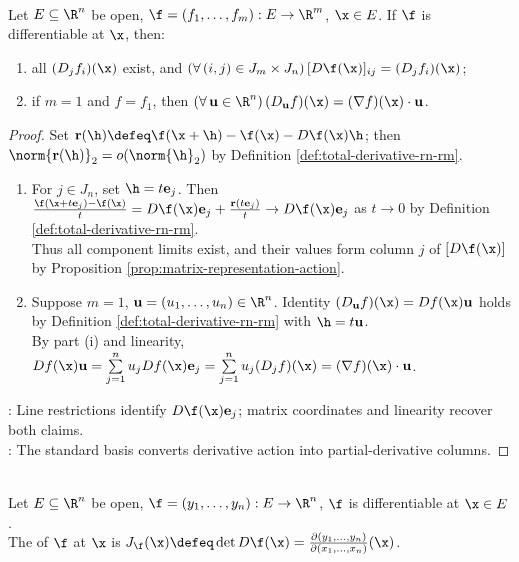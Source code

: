 \begin{theorem} \label{thm:total-derivative-matrix-partials} \\
Let $E\subseteq\R^n$ be open, $\f=(f_1,\ldots,f_m):E\to\R^m$, $\x\in E$. If $\f$ is differentiable at $\x$, then:
\begin{enumerate}[label=(\roman*)]
\setlength{\itemsep}{0pt}
\item all $(D_jf_i)(\x)$ exist, and $(\forall\,(i,j)\in J_m\times J_n)\,[D\f(\x)]_{ij}=(D_jf_i)(\x)$;
\item if $m=1$ and $f=f_1$, then $(\forall\,\mathbf u\in\R^n)\,(D_{\mathbf u}f)(\x)=(\nabla f)(\x)\cdot\mathbf u$.
\end{enumerate}
\begin{proof}
Set $\mathbf r(\h)\defeq\f(\x+\h)-\f(\x)-D\f(\x)\h$; then $\norm{\mathbf r(\h)}_2=o(\norm{\h}_2)$ by Definition \ref{def:total-derivative-rn-rm}.
\begin{enumerate}[label=(\roman*)]
\setlength{\itemsep}{0pt}
\item For $j\in J_n$, set $\h=t\mathbf e_j$. Then $\frac{\f(\x+t\mathbf e_j)-\f(\x)}{t}=D\f(\x)\mathbf e_j+\frac{\mathbf r(t\mathbf e_j)}{t}\to D\f(\x)\mathbf e_j$ as $t\to0$ by Definition \ref{def:total-derivative-rn-rm}.\\
Thus all component limits exist, and their values form column $j$ of $[D\f(\x)]$ by Proposition \ref{prop:matrix-representation-action}.
\item Suppose $m=1$, $\mathbf u=(u_1,\ldots,u_n)\in\R^n$. Identity $(D_{\mathbf u}f)(\x)=Df(\x)\mathbf u$ holds by Definition \ref{def:total-derivative-rn-rm} with $\h=t\mathbf u$.\\
By part (i) and linearity, $Df(\x)\mathbf u=\sum\limits_{j=1}^{n}u_jDf(\x)\mathbf e_j=\sum\limits_{j=1}^{n}u_j(D_jf)(\x)=(\nabla f)(\x)\cdot\mathbf u$.
\end{enumerate}
: Line restrictions identify $D\f(\x)\mathbf e_j$; matrix coordinates and linearity recover both claims.\\
: The standard basis converts derivative action into partial-derivative columns.
\end{proof}
\end{theorem}

\begin{definition} \label{def:jacobian-determinant} \\
Let $E\subseteq\R^n$ be open, $\f=(y_1,\ldots,y_n):E\to\R^n$, $\f$ is differentiable at $\x\in E$.\\
The  of $\f$ at $\x$ is $J_{\f}(\x)\defeq\det D\f(\x)=\frac{\partial(y_1,\ldots,y_n)}{\partial(x_1,\ldots,x_n)}(\x)$.
\end{definition}

